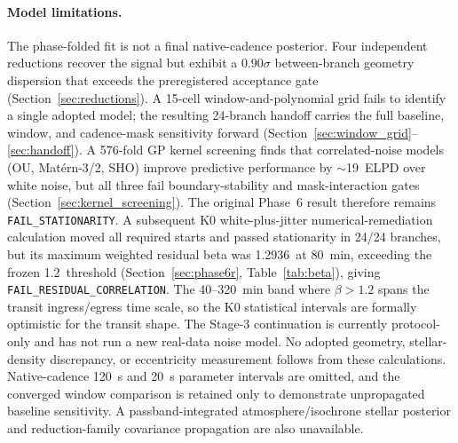 \documentclass[11pt]{article}
\begin{document}
\paragraph{Model limitations.}
The phase-folded fit is not a final native-cadence posterior.  Four independent
reductions recover the signal but exhibit a $0.90\sigma$ between-branch
geometry dispersion that exceeds the preregistered acceptance gate
(Section~\ref{sec:reductions}).  A 15-cell window-and-polynomial grid fails
to identify a single adopted model; the resulting 24-branch handoff
carries the full baseline, window, and cadence-mask sensitivity forward
(Section~\ref{sec:window_grid}--\ref{sec:handoff}).  A 576-fold GP kernel
screening finds that correlated-noise models (OU, Mat\'ern-3/2, SHO) improve
predictive performance by $\sim$19~ELPD over white noise, but all three fail
boundary-stability and mask-interaction gates
(Section~\ref{sec:kernel_screening}).  The original Phase~6 result therefore
remains \texttt{FAIL\_STATIONARITY}.  A subsequent K0 white-plus-jitter
numerical-remediation calculation moved all required starts and passed
stationarity in 24/24 branches, but its maximum weighted residual beta was
1.2936~at 80~min, exceeding the frozen 1.2~threshold
(Section~\ref{sec:phase6r}, Table~\ref{tab:beta}), giving
\texttt{FAIL\_RESIDUAL\_CORRELATION}.  The 40--320~min band where $\beta>1.2$
spans the transit ingress/egress time scale, so the K0 statistical intervals
are formally optimistic for the transit shape.  The Stage-3 continuation is
currently protocol-only and has not run a new real-data noise model.  No adopted
geometry, stellar-density discrepancy, or eccentricity measurement follows
from these calculations.  Native-cadence 120~s and 20~s parameter intervals are
omitted, and the converged window comparison is retained only to demonstrate
unpropagated baseline sensitivity.  A passband-integrated
atmosphere/isochrone stellar posterior and reduction-family covariance
propagation are also unavailable.
\end{document}

